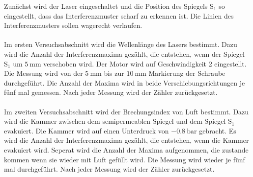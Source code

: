 Zunächst wird der Laser eingeschaltet und die Position des Spiegels $\text{S}_1$ so eingestellt, dass das Interferenzmuster
scharf zu erkennen ist. Die Linien des Interferenzmusters sollen wagerecht verlaufen.
\\
\\
Im ersten Versuchsabschnitt wird die Wellenlänge des Lasers bestimmt. Dazu wird die Anzahl der Interferenzmaxima gezählt, die
entstehen, wenn der Spiegel $\text{S}_1$ um $\SI{5}{\milli\meter}$ verschoben wird. Der Motor wird auf Geschwindigkeit $2$ eingestellt.
Die Messung wird von der $\SI{5}{\milli\meter}$  bis zur $\SI{10}{\milli\meter}$ Markierung der Schraube durchgeführt.
Die Anzahl der Maxima wird in beide Verschiebungsrichtungen je fünf mal gemessen. Nach jeder Messung wird der Zähler zurückgesetzt.
\\
\\
Im zweiten Versuchsabschnitt wird der Brechungsindex von Luft bestimmt. 
Dazu wird die Kammer zwischen dem semipermeablen Spiegel und dem Spiegel $\text{S}_1$ evakuiert.
Die Kammer wird auf einen Unterdruck von $\SI{-0.8}{\bar}$ gebracht.
Es wird die Anzahl der Interferenzmaxima gezählt, die entstehen, wenn die Kammer evakuiert wird. 
Seperat wird die Anzahl der Maxima aufgenommen, die zustande kommen wenn sie wieder mit Luft gefüllt wird.
Die Messung wird wieder je fünf mal durchgeführt. Nach jeder Messung wird der Zähler zurückgesetzt.